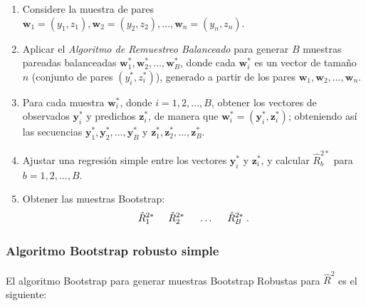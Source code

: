 \begin{enumerate}
	\item Considere la muestra de pares \( \mathbf{w}_{1} = (y_{1}, z_{1}), \mathbf{w}_{2} = (y_{2}, z_{2}), \dots, \mathbf{w}_{n} = (y_{n}, z_{n}) \).
	
	\item Aplicar el \textit{Algoritmo de Remuestreo Balanceado} para generar \( B \) muestras pareadas balanceadas \( \mathbf{w}^{*}_{1}, \mathbf{w}^{*}_{2}, \dots, \mathbf{w}^{*}_{B} \), donde cada \( \mathbf{w}^{*}_{i} \) es un vector de tamaño \( n \) (conjunto de pares \( (y_{i}^{*}, z_{i}^{*}) \)), generado a partir de los pares \( \mathbf{w}_{1}, \mathbf{w}_{2}, \dots, \mathbf{w}_{n} \).
	
	\item Para cada muestra \( \mathbf{w}^{*}_{i} \), donde \( i = 1, 2, \dots, B \), obtener los vectores de observados \( \mathbf{y}^{*}_{i} \) y predichos \( \mathbf{z}^{*}_{i} \), de manera que \( \mathbf{w}^{*}_{i} = (\mathbf{y}_{i}^{*}, \mathbf{z}_{i}^{*}) \); obteniendo así las secuencias \( \mathbf{y}_{1}^{*}, \mathbf{y}_{2}^{*}, \dots, \mathbf{y}_{B}^{*} \) y \( \mathbf{z}_{1}^{*}, \mathbf{z}_{2}^{*}, \dots, \mathbf{z}_{B}^{*} \).
	
	\item Ajustar una regresión simple entre los vectores \( \mathbf{y}^{*}_{i} \) y \( \mathbf{z}_{i}^{*} \), y calcular \( \hat{R}^{2*}_{b} \) para \( b = 1, 2, \dots, B \).
	
	\item Obtener las muestras Bootstrap:
	\[
	\hat{R}^{2*}_{1} \hspace{.5cm} \hat{R}^{2*}_{2} \hspace{.5cm} \dots \hspace{.5cm} \hat{R}^{2*}_{B} \; .
	\]
\end{enumerate}



\subsubsection{Algoritmo Bootstrap robusto simple \parencite{zacarias-2023} }
El algoritmo Bootstrap para generar muestras Bootstrap Robustas para $\hat{R}^{2}$ es el siguiente:

